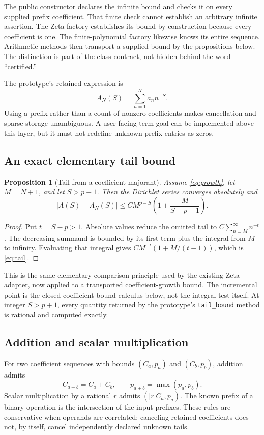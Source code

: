 \documentclass[11pt,letterpaper]{article}
\newcommand{\code}[1]{\nolinkurl{#1}}
\newtheorem{proposition}{Proposition}[section]
\begin{document}
The public constructor declares the infinite bound and checks it on every
supplied prefix coefficient. That finite check cannot establish an arbitrary
infinite assertion. The Zeta factory establishes its bound by construction
because every coefficient is one. The finite-polynomial factory likewise
knows its entire sequence. Arithmetic methods then transport a supplied bound
by the propositions below. The distinction is part of the class contract, not
hidden behind the word ``certified.''

The prototype's retained expression is
\begin{equation}
 A_N(S)=\sum_{n=1}^{N}a_n n^{-S}.
\end{equation}
Using a prefix rather than a count of nonzero coefficients makes cancellation
and sparse storage unambiguous. A user-facing term goal can be implemented
above this layer, but it must not redefine unknown prefix entries as zeros.

\subsection{An exact elementary tail bound}
\begin{proposition}[Tail from a coefficient majorant]\label{prop:tail}
Assume \eqref{eq:growth}, let $M=N+1$, and let $S>p+1$. Then the Dirichlet series
converges absolutely and
\begin{equation}\label{eq:tail}
 |A(S)-A_N(S)|
 \leq C M^{p-S}\left(1+\frac{M}{S-p-1}\right).
\end{equation}
\end{proposition}
\begin{proof}
Put $t=S-p>1$. Absolute values reduce the omitted tail to
$C\sum_{n=M}^{\infty}n^{-t}$. The decreasing summand is bounded by its first
term plus the integral from $M$ to infinity. Evaluating that integral gives
$CM^{-t}(1+M/(t-1))$, which is \eqref{eq:tail}.
\end{proof}

This is the same elementary comparison principle used by the existing Zeta
adapter, now applied to a transported coefficient-growth bound. The incremental
point is the closed coefficient-bound calculus below, not the integral test
itself. At integer $S>p+1$, every quantity returned by the prototype's
\code{tail_bound} method is rational and computed exactly.

\subsection{Addition and scalar multiplication}
For two coefficient sequences with bounds $(C_a,p_a)$ and $(C_b,p_b)$,
addition admits
\begin{equation}
 C_{a+b}=C_a+C_b,\qquad p_{a+b}=\max(p_a,p_b).
\end{equation}
Scalar multiplication by a rational $r$ admits $(|r|C_a,p_a)$. The known prefix
of a binary operation is the intersection of the input prefixes. These rules
are conservative when operands are correlated: canceling retained coefficients
does not, by itself, cancel independently declared unknown tails.
\end{document}

